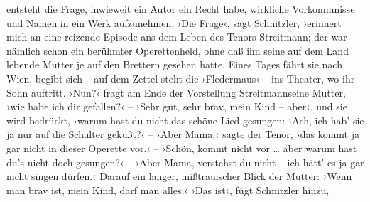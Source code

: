 \begin{ledgroupsized}[t]{13cm}
{{{                     entsteht die Frage, inwieweit ein Autor ein Recht habe, wirkliche Vorkommnisse
                     und Namen in ein Werk aufzunehmen, ›Die Frage‹, sagt Schnitzler, ›erinnert mich an eine reizende Episode ans
                     dem Leben des Tenors Streitmann; der war
                     nämlich schon ein berühmter Operettenheld, ohne daß ihn seine auf dem Land
                     lebende Mutter je auf den Brettern gesehen hatte. Eines Tages fährt sie nach
                        Wien, begibt sich – auf dem Zettel steht die
                        ›Fledermaus‹ – ins Theater, wo ihr Sohn
                     auftritt. ›Nun?‹ fragt am Ende der Vorstellung Streitmannseine Mutter, ›wie habe ich dir gefallen?‹ – ›Sehr gut,
                     sehr brav, mein Kind – aber‹, und sie wird bedrückt, ›warum hast du nicht das
                     schöne Lied gesungen: ›Ach, ich
                        hab’ sie ja nur auf die Schulter geküßt?‹ – ›Aber Mama,‹ sagte der
                     Tenor, ›das kommt ja gar nicht in dieser Operette vor.‹ – ›Schön, kommt nicht
                     vor {\dots} aber warum hast du’s nicht doch gesungen?‹ –
                     ›Aber Mama, verstehst du nicht – ich hätt’ es ja gar nicht singen dürfen.‹
                     Darauf ein langer, mißtrauischer Blick der Mutter: ›Wenn man brav ist, mein Kind, darf man
                     alles.‹ ›Das ist‹, fügt Schnitzler hinzu,
}}}
\end{ledgroupsized}
